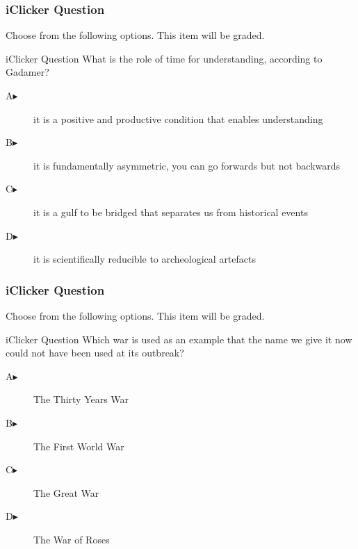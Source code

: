 \documentclass[xcolor=dvipsnames]{beamer}
\begin{document}
\begin{frame}
  \frametitle{iClicker Question}
Choose from the following options. This item will be graded.
\begin{block}{iClicker Question}
What is the role of time for understanding, according to Gadamer?
\end{block}
\begin{description}
\item[A\hspace{.2in}$\blacktriangleright$] it is a positive and productive condition that enables understanding
\item[B\hspace{.2in}$\blacktriangleright$] it is fundamentally asymmetric, you can go forwards but not backwards
\item[C\hspace{.2in}$\blacktriangleright$] it is a gulf to be bridged that separates us from historical events
\item[D\hspace{.2in}$\blacktriangleright$] it is scientifically reducible to archeological artefacts
\end{description}
\end{frame}

\begin{frame}
  \frametitle{iClicker Question}
Choose from the following options. This item will be graded.
\begin{block}{iClicker Question}
Which war is used as an example that the name we give it now could
not have been used at its outbreak?
\end{block}
\begin{description}
\item[A\hspace{.2in}$\blacktriangleright$] The Thirty Years War
\item[B\hspace{.2in}$\blacktriangleright$] The First World War
\item[C\hspace{.2in}$\blacktriangleright$] The Great War
\item[D\hspace{.2in}$\blacktriangleright$] The War of Roses
\end{description}
\end{frame}
\end{document}
